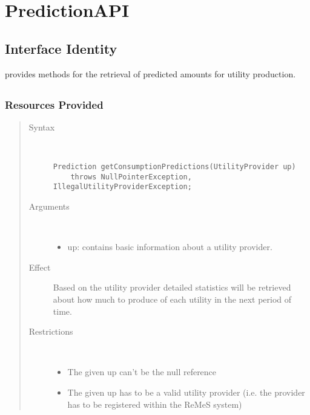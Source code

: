 \section{PredictionAPI}
\label{api:other-prediction-api}

\subsection{Interface Identity}

\npar {} provides methods for the retrieval of
predicted amounts for utility production.

\subsection{}

\subsubsection{Resources Provided}

\begin{quote}
	\begin{description}
		\item[Syntax] \
		\begin{verbatim}
Prediction getConsumptionPredictions(UtilityProvider up)
    throws NullPointerException, IllegalUtilityProviderException;
		\end{verbatim}
		\item[Arguments] \
		\begin{itemize}
		  \item up: contains basic information about a utility provider.
		\end{itemize}
		\item[Effect] Based on the utility provider detailed statistics will be
		retrieved about how much to produce of each utility in the next period of
		time.
		\item[Restrictions] \
		\begin{itemize}
		  \item The given up can't be the null reference
		  \item The given up has to be a valid utility provider (i.e. the provider
		  has to be registered within the ReMeS system)
		\end{itemize}
	\end{description} 
\end{quote}

